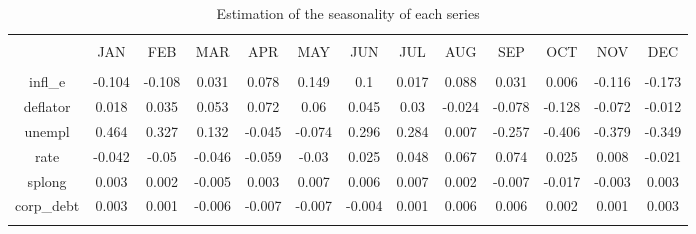 
\begin{table}[!htbp] \centering 
  \caption{Estimation of the seasonality of each series} 
  \label{tab:seasons} 
\begin{tabular}{@{\extracolsep{5pt}} ccccccccccccc} 
\\[-1.8ex]\hline 
\hline \\[-1.8ex] 
 & JAN & FEB & MAR & APR & MAY & JUN & JUL & AUG & SEP & OCT & NOV & DEC \\ 
\hline \\[-1.8ex] 
infl\_e & -0.104 & -0.108 & 0.031 & 0.078 & 0.149 & 0.1 & 0.017 & 0.088 & 0.031 & 0.006 & -0.116 & -0.173 \\ 
deflator & 0.018 & 0.035 & 0.053 & 0.072 & 0.06 & 0.045 & 0.03 & -0.024 & -0.078 & -0.128 & -0.072 & -0.012 \\ 
unempl & 0.464 & 0.327 & 0.132 & -0.045 & -0.074 & 0.296 & 0.284 & 0.007 & -0.257 & -0.406 & -0.379 & -0.349 \\ 
rate & -0.042 & -0.05 & -0.046 & -0.059 & -0.03 & 0.025 & 0.048 & 0.067 & 0.074 & 0.025 & 0.008 & -0.021 \\ 
splong & 0.003 & 0.002 & -0.005 & 0.003 & 0.007 & 0.006 & 0.007 & 0.002 & -0.007 & -0.017 & -0.003 & 0.003 \\ 
corp\_debt & 0.003 & 0.001 & -0.006 & -0.007 & -0.007 & -0.004 & 0.001 & 0.006 & 0.006 & 0.002 & 0.001 & 0.003 \\ 
\hline \\[-1.8ex] 
\end{tabular} 
\end{table} 
